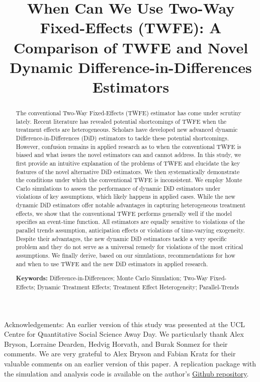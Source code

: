 
\title{When Can We Use Two-Way Fixed-Effects (TWFE): A Comparison of TWFE and Novel Dynamic Difference-in-Differences Estimators}
\maketitle



\begin{abstract}

The conventional Two-Way Fixed-Effects (TWFE) estimator has come under scrutiny lately. Recent literature has revealed potential shortcomings of TWFE when the treatment effects are heterogeneous. Scholars have developed new advanced dynamic Difference-in-Differences (DiD) estimators to tackle these potential shortcomings. However, confusion remains in applied research as to when the conventional TWFE is biased and what issues the novel estimators can and cannot address. In this study, we first provide an intuitive explanation of the problems of TWFE and elucidate the key features of the novel alternative DiD estimators. We then systematically demonstrate the conditions under which the conventional TWFE is inconsistent. We employ Monte Carlo simulations to assess the performance of dynamic DiD estimators under violations of key assumptions, which likely happens in applied cases. While the new dynamic DiD estimators offer notable advantages in capturing heterogeneous treatment effects, we show that the conventional TWFE performs generally well if the model specifies an event-time function. All estimators are equally sensitive to violations of the parallel trends assumption, anticipation effects or violations of time-varying exogeneity. Despite their advantages, the new dynamic DiD estimators tackle a very specific problem and they do not serve as a universal remedy for violations of the most critical assumptions. We finally derive, based on our simulations, recommendations for how and when to use TWFE and the new DiD estimators in applied research.

\bigskip\noindent\textbf{Keywords:} Difference-in-Differences; Monte Carlo Simulation; Two-Way Fixed-Effects; Dynamic Treatment Effects; Treatment Effect Heterogeneity; Parallel-Trends

\end{abstract}


\vfill
\begin{footnotesize}
Acknowledgements: An earlier version of this study was presented at the UCL Centre for Quantitative Social Science Away Day. We particularly thank Alex Bryson, Lorraine Dearden, Hedvig Horvath, and Burak Sonmez for their comments. We are very grateful to Alex Bryson and Fabian Kratz for their valuable comments on an earlier version of this paper.  A replication package with the simulation and analysis code is available on the author's \href{https://github.com/ruettenauer/did_sim}{Github repository}.
\end{footnotesize}



